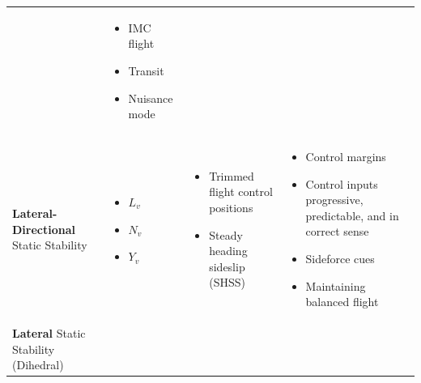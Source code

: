 \documentclass[
]{book}
\providecommand{\tightlist}{%
  \setlength{\itemsep}{0pt}\setlength{\parskip}{0pt}}
\begin{document}
\begin{longtable}[]{@{}llll@{}}
\begin{minipage}[t]{0.27\columnwidth}
\begin{itemize}
\end{itemize}\strut
\end{minipage} & \begin{minipage}[t]{0.33\columnwidth}\raggedright
\begin{itemize}
\tightlist
\item
  IMC flight
\item
  Transit
\item
  Nuisance mode
\end{itemize}\strut
\end{minipage}\tabularnewline
\begin{minipage}[t]{0.16\columnwidth}\raggedright
\textbf{Lateral-Directional}
Static Stability\strut
\end{minipage} & \begin{minipage}[t]{0.14\columnwidth}\raggedright
\begin{itemize}
\tightlist
\item
  \(L_v\)
\item
  \(N_v\)
\item
  \(Y_v\)
\end{itemize}\strut
\end{minipage} & \begin{minipage}[t]{0.27\columnwidth}\raggedright
\begin{itemize}
\tightlist
\item
  Trimmed flight control positions
\item
  Steady heading sideslip (SHSS)
\end{itemize}\strut
\end{minipage} & \begin{minipage}[t]{0.33\columnwidth}\raggedright
\begin{itemize}
\tightlist
\item
  Control margins
\item
  Control inputs progressive, predictable, and in correct sense
\item
  Sideforce cues
\item
  Maintaining balanced flight
\end{itemize}\strut
\end{minipage}\tabularnewline
\begin{minipage}[t]{0.16\columnwidth}\raggedright
\textbf{Lateral}
Static Stability
(Dihedral)\strut
\end{minipage} & \begin{minipage}[t]{0.14\columnwidth}\raggedright
\begin{itemize}

\end{itemize}
\end{minipage}
\end{longtable}
\end{document}
